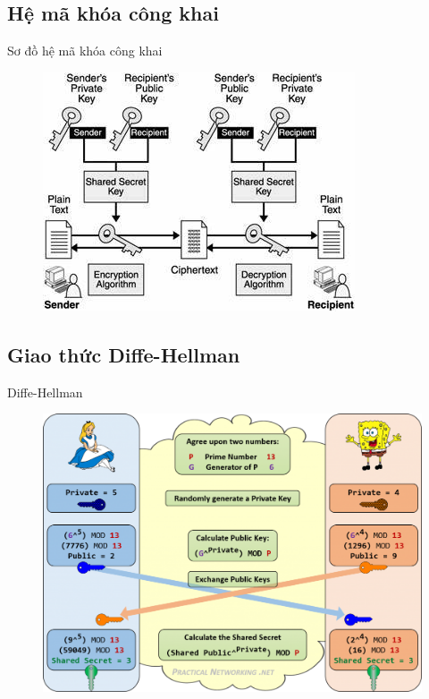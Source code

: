 \documentclass[compress]{beamer}
\begin{document}
\subsection{Hệ mã khóa công khai}
\begin{frame}{Sơ đồ hệ mã khóa công khai}
\begin{center}
\begin{figure}[H]
\centering
\includegraphics[width=0.65\linewidth]{../3.jpg}
\end{figure}
\end{center}
\end{frame}
\subsection{Giao thức Diffe-Hellman}
\begin{frame}{Diffe-Hellman}
\begin{center}
\begin{figure}
\includegraphics[width=0.9\linewidth]{../diffe-hellman.png}
\end{figure}
\end{center}
\end{frame}
\end{document}
